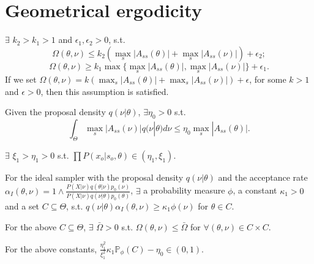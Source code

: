 \section{Geometrical ergodicity}
\begin{assumption}
$\exists$ $k_2 > k_1 > 1$ and $\epsilon_1, \epsilon_2 > 0$, s.t. 
$$\Omega(\theta, \nu) \leq k_2 (  \max_s|A_{ss}(\theta)| +  \max_s|A_{ss}(\nu)| ) + \epsilon_2 ;$$
$$\Omega(\theta, \nu) \geq k_1 \max \{ \max_s|A_{ss}(\theta)|, \max_s|A_{ss}(\nu)| \} + \epsilon_1.$$ 
If we set $\Omega(\theta, \nu) = k (  \max_s|A_{ss}(\theta)| +  \max_s|A_{ss}(\nu)| ) + \epsilon$, for some $k > 1$ and $\epsilon > 0$, then this assumption is satisfied.
\end{assumption}

\begin{assumption}
Given the proposal density $q(\nu | \theta)$, $\exists \eta_0 > 0$ s.t. $$ \int_\Theta \max_s|A_{ss}(\nu)| q(\nu | \theta)d\nu \leq \eta_0 \max_s|A_{ss}(\theta)|.$$
\end{assumption}

\begin{assumption}
$\exists$ $ \xi_1 > \eta_1 > 0$ s.t. $\prod P(x_o | s_o, \theta) \in (\eta_1, \xi_1)$.
\end{assumption}

\begin{assumption}
For the ideal sampler with the proposal density $q(\nu| \theta)$ and the acceptance rate $\alpha_I(\theta, \nu) = 1 \wedge \frac{P(X | \nu)q(\theta| \nu)p_0(\nu)}{P(X | \nu)q(\nu| \theta)p_0(\theta)}$, $\exists$ a probability measure $\phi$, a constant $\kappa_1 > 0$ and a set $C \subseteq \Theta$, s.t. $q(\nu | \theta) \alpha_I(\theta, \nu) \geq \kappa_1 \phi(\nu)$ for $\theta \in C$. 
\end{assumption}

\begin{assumption}
For the above $C \subseteq \Theta$, $\exists$ $\bar{\Omega} > 0$ s.t. $\Omega(\theta, \nu)  \leq \bar{\Omega}$ for $\forall (\theta, \nu) \in C \times C$.
\end{assumption}

\begin{assumption}
For the above constants, $\frac{\eta_1^2}{\xi_1^2} \kappa_1 \mathbb{P}_\phi(C)  - \eta_0 \in (0, 1).$
\end{assumption}

